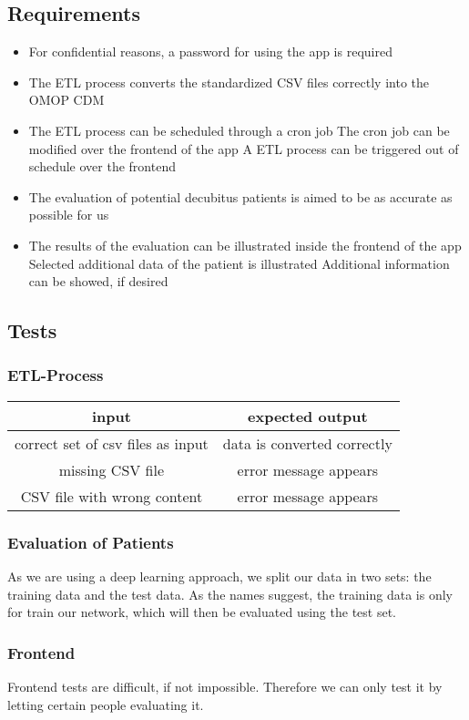 \subsection{Requirements}

\begin{itemize}
	\item For confidential reasons, a password for using the app is required
	\item The ETL process converts the standardized CSV files correctly into the OMOP CDM
	\item The ETL process can be scheduled through a cron job
	\subitem The cron job can be modified over the frontend of the app
	\subitem A ETL process can be triggered out of schedule over the frontend
	\item The evaluation of potential decubitus patients is aimed to be as accurate as possible for us
	\item The results of the evaluation can be illustrated inside the frontend of the app
	\subitem Selected additional data of the patient is illustrated
	\subitem Additional information can be showed, if desired
\end{itemize}

\subsection{Tests}

\subsubsection{ETL-Process}

\begin{tabular}{|c|c|}
	\hline
	input & expected output \\
	\hline
	correct set of csv files as input & data is converted correctly \\
	missing CSV file & error message appears \\
	CSV file with wrong content & error message appears \\
	\hline
\end{tabular}

\subsubsection{Evaluation of Patients}

As we are using a deep learning approach, we split our data in two sets: the training data and the test data. As the names suggest, the training data is only for train our 
network, which will then be evaluated using the test set. 

\subsubsection{Frontend}

Frontend tests are difficult, if not impossible. Therefore we can only test it by letting certain people evaluating it. 


